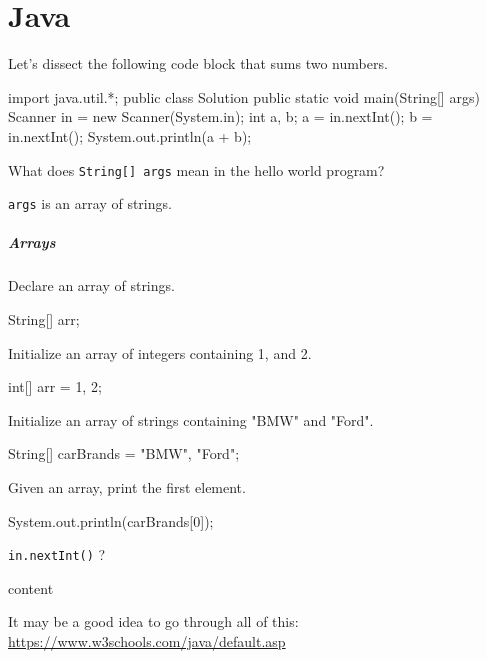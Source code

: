 \chapter{Java}


Let's dissect the following code block that sums two numbers.

\begin{java}
import java.util.*;
public class Solution {
    public static void main(String[] args) {
        Scanner in = new Scanner(System.in);
        int a, b;
        a = in.nextInt();
        b = in.nextInt();
        System.out.println(a + b);
    }
}
\end{java}

\begin{quest}
\item
	What does \texttt{String[] args} mean in the hello world program?

\begin{ans} \texttt{args} is an array of strings. \end{ans}
\end{quest}

\paragraph*{Arrays}
\begin{quest}
\item Declare an array of strings.
\begin{ans}
\begin{java}
String[] arr;
\end{java}
\end{ans}

\item Initialize an array of integers containing 1, and 2.
\begin{ans}
\begin{java}
int[] arr = {1, 2};
\end{java}
\end{ans}

\item Initialize an array of strings containing "BMW" and "Ford".

\begin{ans}
\begin{java}
String[] carBrands = {"BMW", "Ford"};
\end{java}
\end{ans}

\item Given an array,
print the first element.

\begin{ans}
\begin{java}
System.out.println(carBrands[0]);
\end{java}
\end{ans}
\end{quest}


\begin{quest}
\item
	\texttt{in.nextInt()} ?

\begin{ans}
content
\end{ans}

\end{quest}




It may be a good idea to go through all of this: \url{https://www.w3schools.com/java/default.asp}